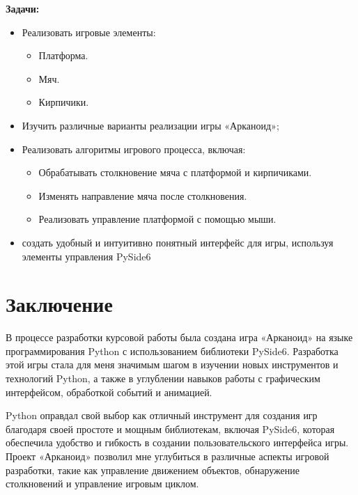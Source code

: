 \documentclass[14pt, oneside]{altsu-report}
\begin{document}
\textbf{Задачи:}
\begin{itemize}
\item Реализовать игровые элементы:
\begin{itemize}
    \item Платформа.
    \item Мяч.
    \item Кирпичики.
\end{itemize}
\item Изучить различные варианты реализации игры «Арканоид»;
\item Реализовать алгоритмы игрового процесса, включая:
\begin{itemize}
    \item Обрабатывать столкновение мяча с платформой и кирпичиками.
    \item Изменять направление мяча после столкновения.
    \item Реализовать управление платформой с помощью мыши.
\end{itemize}
\item создать удобный и интуитивно понятный интерфейс для игры, используя элементы управления PySide6
\end{itemize}





\chapter*{Заключение}

В процессе разработки курсовой работы была создана игра «Арканоид» на языке программирования Python с использованием библиотеки PySide6. Разработка этой игры стала для меня значимым шагом в изучении новых инструментов и технологий Python, а также в углублении навыков работы с графическим интерфейсом, обработкой событий и анимацией.

Python оправдал свой выбор как отличный инструмент для создания игр благодаря своей простоте и мощным библиотекам, включая PySide6, которая обеспечила удобство и гибкость в создании пользовательского интерфейса игры. Проект «Арканоид» позволил мне углубиться в различные аспекты игровой разработки, такие как управление движением объектов, обнаружение столкновений и управление игровым циклом.
\end{document}
